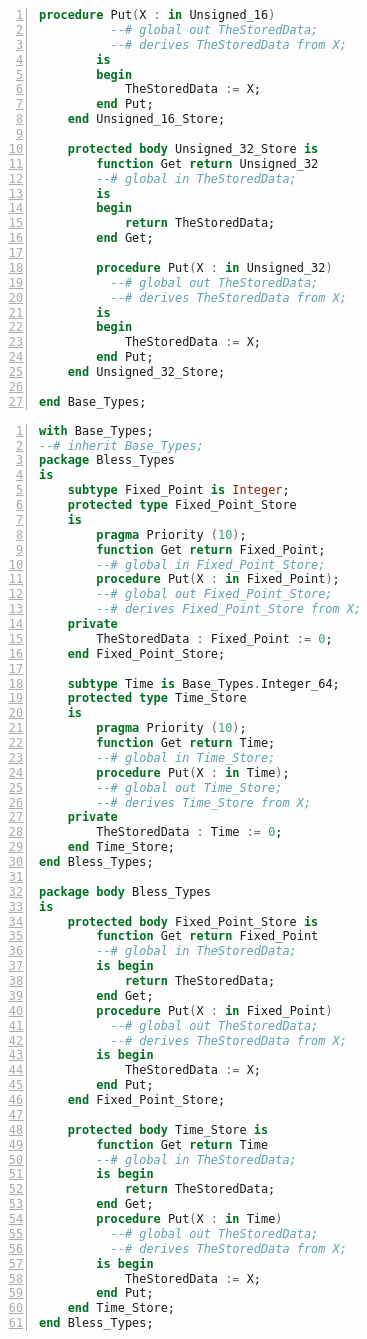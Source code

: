 \begin{lstlisting}[language=ada, gobble=0, numbers=left, caption={\lstinline{Base_Types} package}, label={listing:pca_generated:base_types}]
        procedure Put(X : in Unsigned_16)
          --# global out TheStoredData;
          --# derives TheStoredData from X;
        is
        begin
            TheStoredData := X;
        end Put;
    end Unsigned_16_Store;

    protected body Unsigned_32_Store is
        function Get return Unsigned_32
        --# global in TheStoredData;
        is
        begin
            return TheStoredData;
        end Get;

        procedure Put(X : in Unsigned_32)
          --# global out TheStoredData;
          --# derives TheStoredData from X;
        is
        begin
            TheStoredData := X;
        end Put;
    end Unsigned_32_Store;

end Base_Types;
\end{lstlisting} 
\doublespacing

\newpage

\singlespacing
\begin{lstlisting}[language=ada, gobble=0, numbers=left, caption={\lstinline{Bless_Types} package}, label={listing:pca_generated:bless_types}]
with Base_Types;
--# inherit Base_Types;
package Bless_Types
is
    subtype Fixed_Point is Integer;
    protected type Fixed_Point_Store 
    is
        pragma Priority (10);
        function Get return Fixed_Point;
        --# global in Fixed_Point_Store;
        procedure Put(X : in Fixed_Point);
        --# global out Fixed_Point_Store;
        --# derives Fixed_Point_Store from X;
    private
        TheStoredData : Fixed_Point := 0;
    end Fixed_Point_Store;

    subtype Time is Base_Types.Integer_64;
    protected type Time_Store 
    is
        pragma Priority (10);
        function Get return Time;
        --# global in Time_Store;
        procedure Put(X : in Time);
        --# global out Time_Store;
        --# derives Time_Store from X;
    private
        TheStoredData : Time := 0;
    end Time_Store;
end Bless_Types;

package body Bless_Types
is
    protected body Fixed_Point_Store is
        function Get return Fixed_Point
        --# global in TheStoredData;
        is begin
            return TheStoredData;
        end Get;
        procedure Put(X : in Fixed_Point)
          --# global out TheStoredData;
          --# derives TheStoredData from X;
        is begin
            TheStoredData := X;
        end Put;
    end Fixed_Point_Store;

    protected body Time_Store is
        function Get return Time
        --# global in TheStoredData;
        is begin
            return TheStoredData;
        end Get;
        procedure Put(X : in Time)
          --# global out TheStoredData;
          --# derives TheStoredData from X;
        is begin
            TheStoredData := X;
        end Put;
    end Time_Store;
end Bless_Types;
\end{lstlisting} 
\doublespacing


